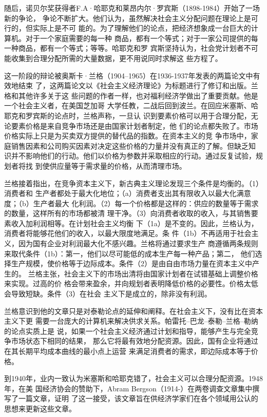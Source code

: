 随后，诺贝尔奖获得者F.A·哈耶克和莱昂内尔·罗宾斯（1898-1984）开始了一场新的争论，
争论不断扩大。他们认为，虽然解决社会主义分配问题在理论上是可行的，但实际上是不可
能的。为了理解他们的论点，把经济想象成一台巨大的计算机。对于一个家庭需要的每一种
商品，都有一个等式；对于一家公司提供的每一种商品，都有一个等式；等等。哈耶克和罗
宾斯坚持认为，社会党计划者不可能收集到合理分配所需的大量数据，更不用说同时求解这
些方程了。

这一阶段的辩论被奥斯卡·兰格（1904--1965）在1936-1937年发表的两篇论文中有效地结束
了，这两篇论文以《社会主义经济理论》为标题进行了修订和出版。兰格和其他许多关于这
些问题的作者一样，也对福利经济学做出了重要贡献。他是一个社会主义者，在美国芝加哥
大学任教，二战后回到波兰。在回应米塞斯、哈耶克和罗宾斯的论点时，兰格声称，一旦认
识到要素价格可以用于合理分配，无论要素价格是来自竞争市场还是由国家计划者制定，他
们的论点都失败了。市场价格实际上只是为买卖双方提供的替代品的指数。在资本主义的竞
争市场中，家庭销售因素和公司购买因素对决定这些价格的力量并没有真正的了解。但缺乏知
识并不影响他们的行动。他们以价格为参数并采取相应的行动。通过反复试验，规划者将找
到使供应量等于需求量的价格，从而清理市场。

兰格接着指出，在竞争资本主义下，新古典主义理论发现三个条件是均衡的。（1）消费者和
生产者都处于最大化地位；（a）消费者支出其有限收入以最大化满意度；（b）生产者最大
化利润。（2）每一个价格都是这样的：供应的数量等于需求的数量，这样所有的市场都被清
理干净。（3）向消费者收取的收入，与其销售要素收入加利润相等。在计划社会主义均衡
下（1a）是不变的。因此，兰格认为，消费者将能够花他们的收入，以最大限度地满足。条
件（1b）不再适用于社会主义，因为国有企业对利润最大化不感兴趣。兰格将通过要求生产
商遵循两条规则来取代条件（1b）：第一，他们以尽可能低的成本生产每一种产品；第二，
他们选择生产规模，使价格等于边际成本。条件（2）是由自由市场力量在资本主义中产生的。
兰格主张，社会主义下的市场出清将由国家计划者在试错基础上调整价格来实现。过高的价
格会带来盈余，并向规划者表明降低价格的必要性。价格太低会导致短缺。条件（3）在社会
主义下是成立的，除非没有利润。

兰格意识到他的文章只是对泰勒论点的延伸和阐释。在社会主义下，没有比在资本主义下更
需要一台庞大的计算机来解决供求关系。帕雷托--巴龙--泰勒--兰格--勒纳的论点实质上是
说，如果一个社会主义经济通过计划和指导，能够产生与完全竞争市场状态下相同的结果，
那么它将最有效地分配资源。因此，国有企业将通过在其长期平均成本曲线的最小点上运营
来满足消费者的需求，即边际成本等于价格。

到1940年，业内一致认为米塞斯和哈耶克错了，社会主义可以合理分配资源。1948年，在美
国经济协会的赞助下，Abram Bergson（1914-）在两卷调查文章集中撰写了一篇文章，证明
了这一接受，该文章旨在供经济学家们在各个领域用公认的思想来更新这些文章。

